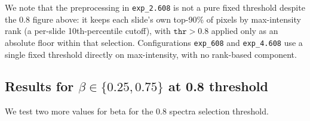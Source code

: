 We note that the preprocessing in \texttt{exp\_2.608} is not a pure fixed threshold despite the $0.8$ figure above: it keeps each slide's own top-90\% of pixels by max-intensity rank (a per-slide 10th-percentile cutoff), with $\texttt{thr}>0.8$ applied only as an absolute floor within that selection. Configurations \texttt{exp\_608} and \texttt{exp\_4.608} use a single fixed threshold directly on max-intensity, with no rank-based component.

\subsection*{Results for $\beta \in \{0.25, 0.75\}$ at 0.8 threshold}
We test two more values for beta for the 0.8 spectra selection threshold.
\begin{table}[H]
\centering
\scriptsize


\end{table}
